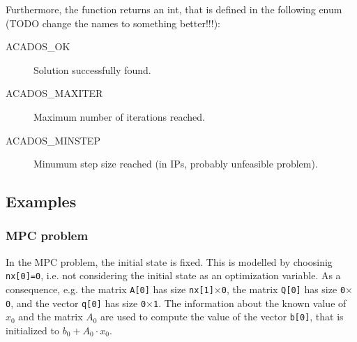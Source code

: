 \documentclass{report}
\begin{document}
Furthermore, the function returns an int, that is defined in the following enum (TODO change the names to something better!!!):
\begin{description}
\item[ACADOS\_OK] Solution successfully found.
\item[ACADOS\_MAXITER] Maximum number of iterations reached.
\item[ACADOS\_MINSTEP] Minumum step size reached (in IPs, probably unfeasible problem).
\end{description}

\subsection{Examples}

\subsubsection{MPC problem}

In the MPC problem, the initial state is fixed.
This is modelled by choosinig {\tt nx[0]=0}, i.e. not considering the initial state as an optimization variable.
As a consequence, e.g. the matrix {\tt A[0]} has size {\tt nx[1]$\times$0}, the matrix {\tt Q[0]} has size {\tt 0$\times$0}, and the vector {\tt q[0]} has size {\tt 0$\times$1}.
The information about the known value of $x_0$ and the matrix $A_0$ are used to compute the value of the vector {\tt b[0]}, that is initialized to $b_0 + A_0 \cdot x_0$.
\end{document}
